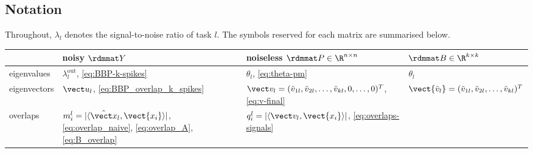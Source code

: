 \subsection{Notation}
Throughout, $\lambda_l$ denotes the signal-to-noise ratio of task $l$. The symbols reserved for each matrix are summarised below.
\begin{center}
\begin{tabular}{l|l|l|l}
 & \textbf{noisy} $\rdmmat Y $ & \textbf{noiseless} $\rdmmat P \in \R^{n\times n}$ & $\rdmmat B \in \R^{k\times k}$\\
\hline
eigenvalues     & $\lambda^{\mathrm{out}}_l$, \eqref{eq:BBP-k-spikes} & $\theta_l$, \eqref{eq:theta-pm} &  $\theta_l$\\
eigenvectors    & $\vect u_l$, \eqref{eq:BBP_overlap_k_spikes} & $\vect v_l = (\Tilde{v}_{1l},\Tilde{v}_{2l},\ldots,\Tilde{v}_{kl},0,\ldots,0)^T$, \eqref{eq:v-final} & $\vect{\Tilde{v}_{l}} = (\Tilde{v}_{1l},\Tilde{v}_{2l},\ldots,\Tilde{v}_{kl})^T$\\
overlaps        & $m_i^l = |\langle \hat{\vect x}_l, \vect{x_i}\rangle|$, \eqref{eq:overlap_naive}, \eqref{eq:overlap_A}, \eqref{eq:B_overlap} & $q_i^l = |\langle \vect v_l, \vect{x_i}\rangle|$, \eqref{eq:overlaps-signals} & \\
\end{tabular}
\end{center}
